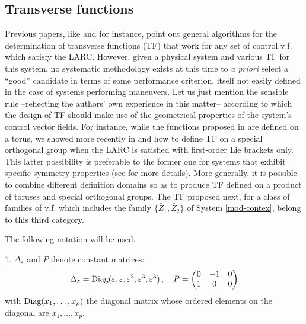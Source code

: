 \documentclass[a4paper,twoside]{article}
\def \eps {\varepsilon}
\newcommand{\tnm}[1]{\textnormal{#1}}
\begin{document}
\subsection{Transverse functions} \label{transverse_functions}
Previous papers, like \cite{ms03} and \cite{ms09-cdc} for instance, point out general algorithms for the determination of transverse functions (TF) that work for any set of control v.f. which satisfy the LARC. However, given a physical system and various TF for this system, no systematic methodology exists at this time to {\em a priori} select a ``good'' candidate in terms of some performance criterion, itself not easily defined in the case of systems performing maneuvers. Let us just mention the sensible rule --reflecting the authors' own experience in this matter-- according to which the design of  TF should make use of the geometrical properties of the system's control vector fields. For instance, while the functions proposed in \cite{ms03} are defined on a torus, we showed more recently in \cite{ims09} and \cite{ms09-cdc} how to define TF on a special orthogonal group when the LARC is satisfied with first-order Lie brackets only. This latter possibility is preferable to the 
former one for systems that exhibit specific symmetry properties (see \cite[Sec. III]{ms09-cdc} for more details).  
More generally, it is possible to combine different definition domains so as to produce TF defined on a product of toruses and 
special orthogonal groups. The TF proposed next, for a class of families of v.f. which includes the family $\{\bar Z_1, \bar Z_2\}$ of 
System  \eqref{mod-contex}, belong to this third category.

The following notation will be used. 

1. $\Delta_\eps$ and $P$ denote constant matrices:
\[
\Delta_\eps = \tnm{Diag}(\eps, \eps, \eps^2,\eps^3,\eps^3) \, , \quad
P= \begin{pmatrix}
0 & -1 & 0 \\
1 & 0 & 0
\end{pmatrix}
\]
with $\tnm{Diag}(x_1, \ldots, x_p)$ the diagonal matrix whose ordered elements on the diagonal are $x_1, \ldots,x_p$.
\end{document}
